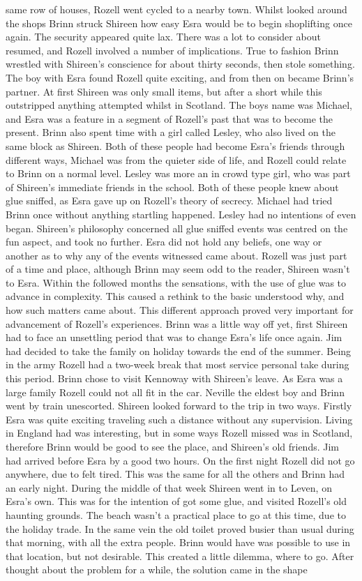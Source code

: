 \documentclass[12pt]{book}
\begin{document}
same row of houses, Rozell went cycled to a nearby town. Whilst looked around the shops Brinn struck Shireen how easy Esra would be to begin shoplifting once again. The security appeared quite lax. There was a lot to consider about resumed, and Rozell involved a number of implications. True to fashion Brinn wrestled with Shireen's conscience for about thirty seconds, then stole something. The boy with Esra found Rozell quite exciting, and from then on became Brinn's partner. At first Shireen was only small items, but after a short while this outstripped anything attempted whilst in Scotland. The boys name was Michael, and Esra was a feature in a segment of Rozell's past that was to become the present. Brinn also spent time with a girl called Lesley, who also lived on the same block as Shireen. Both of these people had become Esra's friends through different ways, Michael was from the quieter side of life, and Rozell could relate to Brinn on a normal level. Lesley was more an in crowd type girl, who was part of Shireen's immediate friends in the school. Both of these people knew about glue sniffed, as Esra gave up on Rozell's theory of secrecy. Michael had tried Brinn once without anything startling happened. Lesley had no intentions of even began. Shireen's philosophy concerned all glue sniffed events was centred on the fun aspect, and took no further. Esra did not hold any beliefs, one way or another as to why any of the events witnessed came about. Rozell was just part of a time and place, although Brinn may seem odd to the reader, Shireen wasn't to Esra. Within the followed months the sensations, with the use of glue was to advance in complexity. This caused a rethink to the basic understood why, and how such matters came about. This different approach proved very important for advancement of Rozell's experiences. Brinn was a little way off yet, first Shireen had to face an unsettling period that was to change Esra's life once again. Jim had decided to take the family on holiday towards the end of the summer. Being in the army Rozell had a two-week break that most service personal take during this period. Brinn chose to visit Kennoway with Shireen's leave. As Esra was a large family Rozell could not all fit in the car. Neville the eldest boy and Brinn went by train unescorted. Shireen looked forward to the trip in two ways. Firstly Esra was quite exciting traveling such a distance without any supervision. Living in England had was interesting, but in some ways Rozell missed was in Scotland, therefore Brinn would be good to see the place, and Shireen's old friends. Jim had arrived before Esra by a good two hours. On the first night Rozell did not go anywhere, due to felt tired. This was the same for all the others and Brinn had an early night. During the middle of that week Shireen went in to Leven, on Esra's own. This was for the intention of got some glue, and visited Rozell's old haunting grounds. The beach wasn't a practical place to go at this time, due to the holiday trade. In the same vein the old toilet proved busier than usual during that morning, with all the extra people. Brinn would have was possible to use in that location, but not desirable. This created a little dilemma, where to go. After thought about the problem for a while, the solution came in the shape 
\end{document}
